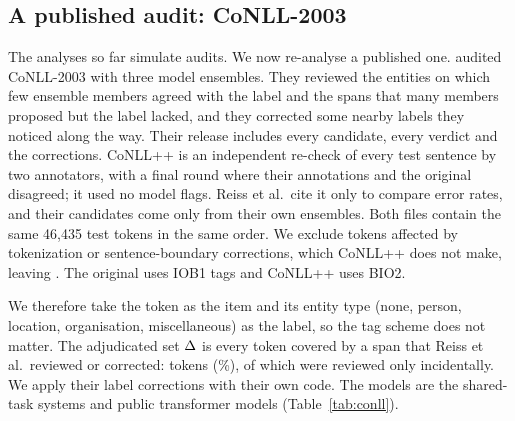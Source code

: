 \subsection{A published audit: CoNLL-2003}
\label{sec:emp-conll}

\begin{table}[t]
\centering
\scriptsize

\caption{Re-analysis of the published DR audit of CoNLL-2003 \citep{reiss2020identifying} against the independent full re-check CoNLL++ \citep{wang2019crossweigh}. Items are the \cnItems{} test tokens, labelled with their entity type. ``DR'' is accuracy against Reiss et al.'s resolved labels; ``CoNLL++'' is accuracy against the reference. The DR bias splits exactly into the hidden-error term and a term measuring disagreement between the two relabelings on audited tokens (Remark~\ref{rem:adjudicator}). ``Correct''/``repeat'' count the \cnHidden{} hidden errors on which a model gives the reference label or repeats the original one. Systems marked 2003 are CoNLL-2003 shared-task entries, whose outputs formed one of the audit's flagging ensembles; the others are later public transformer models. Appendix Table~\ref{tab:conllentity} repeats the analysis on entity tokens.}
\label{tab:conll}
\end{table}

The analyses so far simulate audits. We now re-analyse a published one. \citet{reiss2020identifying} audited CoNLL-2003 with three model ensembles. They reviewed the entities on which few ensemble members agreed with the label and the spans that many members proposed but the label lacked, and they corrected some nearby labels they noticed along the way. Their release includes every candidate, every verdict and the corrections. CoNLL++ \citep{wang2019crossweigh} is an independent re-check of every test sentence by two annotators, with a final round where their annotations and the original disagreed; it used no model flags. Reiss et al.\ cite it only to compare error rates, and their candidates come only from their own ensembles. Both files contain the same 46{,}435 test tokens in the same order. We exclude \cnExcluded{} tokens affected by tokenization or sentence-boundary corrections, which CoNLL++ does not make, leaving \cnItems. The original uses IOB1 tags and CoNLL++ uses BIO2.

We therefore take the token as the item and its entity type (none, person, location, organisation, miscellaneous) as the label, so the tag scheme does not matter. The adjudicated set $\Delta$ is every token covered by a span that Reiss et al.\ reviewed or corrected: \cnAdj{} tokens (\cnAdjPct\%), of which \cnIncidental{} were reviewed only incidentally. We apply their label corrections with their own code. The models are the \cnNentrant{} shared-task systems and \cnNhf{} public transformer models (Table~\ref{tab:conll}).

